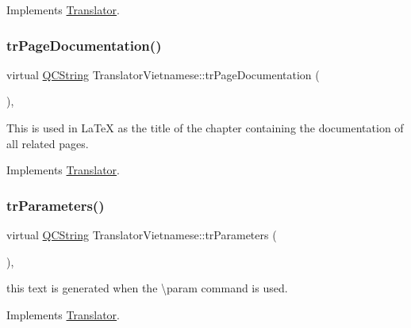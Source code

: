 Implements \mbox{\hyperlink{class_translator}{Translator}}.

\mbox{\label{class_translator_vietnamese_aa5dc0f6746aeaaa324af5f4f115385b9}} 
\subsubsection{\texorpdfstring{trPageDocumentation()}{trPageDocumentation()}}
{\footnotesize\ttfamily virtual \mbox{\hyperlink{class_q_c_string}{Q\+C\+String}} Translator\+Vietnamese\+::tr\+Page\+Documentation (\begin{DoxyParamCaption}{ }\end{DoxyParamCaption})\hspace{0.3cm}{\ttfamily [inline]}, {\ttfamily [virtual]}}

This is used in La\+TeX as the title of the chapter containing the documentation of all related pages. 

Implements \mbox{\hyperlink{class_translator}{Translator}}.

\mbox{\label{class_translator_vietnamese_a0ee81204e48dab999eb017847cdddfdb}} 
\subsubsection{\texorpdfstring{trParameters()}{trParameters()}}
{\footnotesize\ttfamily virtual \mbox{\hyperlink{class_q_c_string}{Q\+C\+String}} Translator\+Vietnamese\+::tr\+Parameters (\begin{DoxyParamCaption}{ }\end{DoxyParamCaption})\hspace{0.3cm}{\ttfamily [inline]}, {\ttfamily [virtual]}}

this text is generated when the \textbackslash{}param command is used. 

Implements \mbox{\hyperlink{class_translator}{Translator}}.

\mbox{\label{class_translator_vietnamese_a60b5d7ee59aaecbebb53eca524761057}} 
